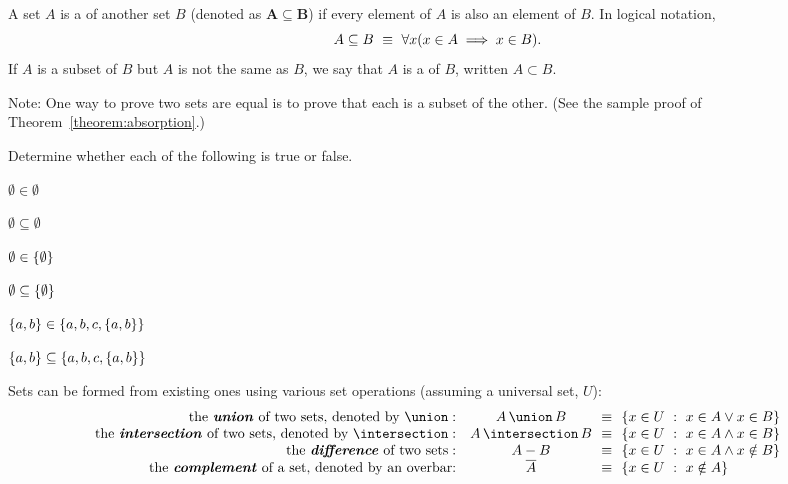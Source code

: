 \begin{defn}[Subsets]
A set $A$ is a  of another set $B$ (denoted as $\bm{A \subseteq B}$) if every element of $A$ is also an element of $B$. In logical notation, \[A \subseteq B \ \equiv\  \forall x (x \in A \implies x \in B).\]
If $A$ is a subset of $B$ but $A$ is not the same as $B$, we say that $A$ is a  of $B$, written $A \subset B$.

Note: One way to prove two sets are equal is to prove that each is a subset of the other. (See the sample proof of Theorem~\ref{theorem:absorption}.)
\end{defn}


\begin{exer}  %
Determine whether each of the following is true or false.
\begin{exenumerate}
\item $\emptyset \in \emptyset$
\item $\emptyset \subseteq \emptyset$ 
\item $\emptyset \in \left\lbrace \emptyset \right\rbrace$
\item $\emptyset \subseteq \left\lbrace \emptyset \right\rbrace$
\item $\left\lbrace a, b \right\rbrace \in \left\lbrace a, b, c, \left\lbrace a, b \right\rbrace \right\rbrace$
\item $\left\lbrace a, b \right\rbrace \subseteq \left\lbrace a, b, c, \left\lbrace a, b \right\rbrace \right\rbrace$
\end{exenumerate}
\end{exer}

\begin{defn}\label{definition:setops}
Sets can be formed from existing ones using various set operations (assuming a universal set, $U$):
\[
\begin{array}{r@{\ \ \ }c@{\ \definedas\ }l}
\textrm{the \defterm{union} of two sets, denoted by}~\union: & \setunion{A}{B} & \setbuild{x \in U}{x \in A \lor x \in B} \\
\textrm{the \defterm{intersection} of two sets, denoted by}~\intersection: & \setintersection{A}{B} &
					 \setbuild{x \in U}{x \in A \land x \in B} \\
\textrm{the \defterm{difference} of two sets}: & A - B & \setbuild{x \in U}{x \in A \land x \notin B} \\
\textrm{the \defterm{complement} of a set, denoted by an overbar:} & \setcomplement{A} &
					 \setbuild{x \in U}{x \notin A}
\end{array}
\]

\end{defn}

